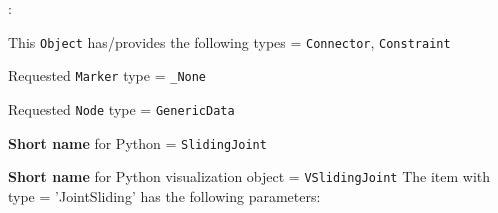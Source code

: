 \noindent {}:
\bi
  \item This \texttt{Object} has/provides the following types = \texttt{Connector}, \texttt{Constraint}
  \item Requested \texttt{Marker} type = \texttt{\_None}
  \item Requested \texttt{Node} type = \texttt{GenericData}
  \item {\bf Short name} for Python = \texttt{SlidingJoint}
  \item {\bf Short name} for Python visualization object = \texttt{VSlidingJoint}
\ei\vspace{12pt} \noindent 
The item  with type = 'JointSliding' has the following parameters:
\vspace{-0.5cm}\\
\vspace{-0.5cm}\\

